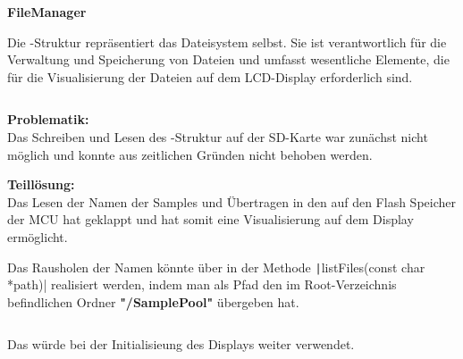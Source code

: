  \inputminted[firstline=60, lastline=63]{c}{../../f401_display_encoder_fader_test/Core/Inc/filemanager.h}
 
\vspace{1em}
\textbf{FileManager}
\vspace{1em}

Die -Struktur repräsentiert das Dateisystem selbst. Sie ist verantwortlich für die Verwaltung und Speicherung von Dateien und umfasst wesentliche Elemente, die für die Visualisierung der Dateien auf dem LCD-Display erforderlich sind.
 
 \inputminted[firstline=72, lastline=81]{c}{../../f401_display_encoder_fader_test/Core/Inc/filemanager.h}
 


\newpage
\textbf{Problematik:} \\

Das Schreiben und Lesen des -Struktur auf der SD-Karte war zunächst nicht möglich und konnte aus zeitlichen Gründen nicht behoben werden.

\textbf{Teillösung:} \\

Das Lesen der Namen der Samples und Übertragen in den  auf den Flash Speicher der MCU hat geklappt und hat somit eine Visualisierung auf dem Display ermöglicht.

Das Rausholen der Namen könnte über  in der Methode \texttt|listFiles(const char *path)| realisiert werden, indem man als Pfad den im Root-Verzeichnis befindlichen Ordner \textbf{"/SamplePool"} übergeben hat.


 \inputminted[firstline=373, lastline=387]{c}{../../f401_display_encoder_fader_test/Core/Src/interface.c}
 
 Das  würde bei der Initialisieung des Displays weiter verwendet. 
 




